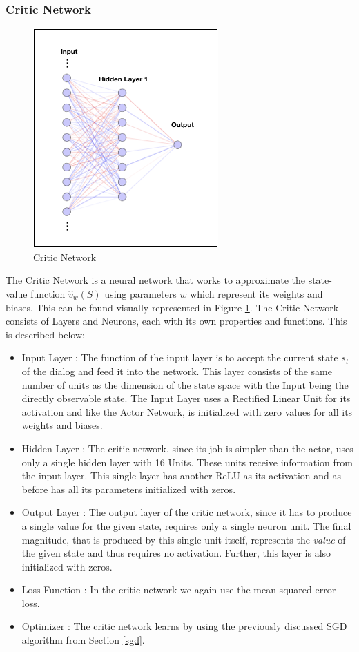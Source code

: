 \documentclass[12pt]{extarticle}
\numberwithin{equation}{section}
\begin{document}
	\subsubsection{Critic Network}
	\begin{figure}[H]
		\vspace{0.2cm}
		\centering
		\includegraphics[scale=0.6]{nn-critic}
		\caption{Critic Network
			\label{nn-critic}}
	\end{figure}
	The Critic Network is a neural network that works to approximate the state-value function $\hat{v}_w(S)$ using parameters $w$ which represent its weights and biases. This can be found visually represented in Figure \ref{nn-critic}. The Critic Network consists of Layers and Neurons, each with its own properties and functions. This is described below:
	\begin{itemize}
		\item Input Layer : The function of the input layer is to accept the current state $s_t$ of the dialog and feed it into the network. This layer consists of the same number of units as the dimension of the state space with the Input being the directly observable state. The Input Layer uses a Rectified Linear Unit for its activation and like the Actor Network, is initialized with zero values for all its weights and biases.
		\item Hidden Layer : The critic network, since its job is simpler than the actor, uses only a single hidden layer with 16 Units. These units receive information from the input layer. This single layer has another ReLU as its activation and as before has all its parameters initialized with zeros.
		\item Output Layer : The output layer of the critic network, since it has to produce a single value for the given state, requires only a single neuron unit. The final magnitude, that is produced by this single unit itself, represents the \textit{value} of the given state and thus requires no activation. Further, this layer is also initialized with zeros.
		\item Loss Function : In the critic network we again use the mean squared error loss.
		\item Optimizer : The critic network learns by using the previously discussed SGD algorithm from Section \ref{sgd}.
	\end{itemize}
	
\end{document}
